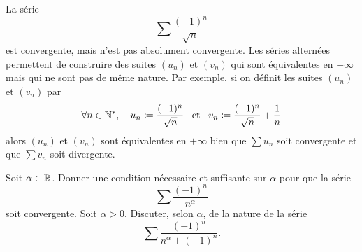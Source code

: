\documentclass{magnolia}
\begin{document}
\begin{remarques}
\remarque La série
  \[\sum \frac{(-1)^n}{\sqrt{n}}\]
  est convergente, mais n'est pas absolument convergente.
\remarque Les séries alternées permettent de construire des suites $(u_n)$ et $(v_n)$
  qui sont équivalentes en $+\infty$ mais qui ne sont pas de même nature. Par exemple,
  si on définit les suites $(u_n)$ et $(v_n)$ par
  \[\forall n\in{\mathbb{N}^*},\quad u_n\coloneqq\frac{(-1)^n}{\sqrt{n}} \quad\!\text{et}\quad\!
    v_n\coloneqq\frac{(-1)^n}{\sqrt{n}}+\frac{1}{n}\]
  alors $(u_n)$ et $(v_n)$ sont équivalentes en $+\infty$ bien que $\sum u_n$ soit convergente
  et que $\sum v_n$ soit divergente.
\end{remarques}

\begin{exos}
\exo Soit $\alpha\in\mathbb{R}$. Donner une condition nécessaire et suffisante sur $\alpha$ pour que
  la série
  \[\sum \frac{(-1)^n}{n^\alpha}\]
  soit convergente.
\exo Soit $\alpha>0$. Discuter, selon $\alpha$, de la nature de la série
  \[\sum \frac{(-1)^n}{n^\alpha + (-1)^n}.\]
\end{exos}

\end{document}
